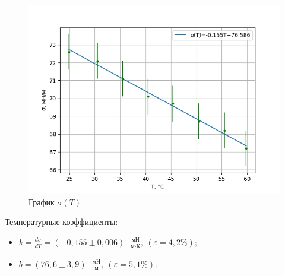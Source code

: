 \documentclass[a4paper,12pt]{article}
\theoremstyle{definition}
\begin{document}
    \begin{figure}[h!]
            \centering
            \includegraphics{st.png}
            \caption{График $\sigma(T)$}
            \label{graph}
    \end{figure}
	Температурные коэффициенты:
    \begin{itemize}
	\item $ \displaystyle \underline{k = \frac{d\sigma}{dT} = (-0,155 \pm 0,006) \text{ } \frac{\text{мН}}{\text{м}\cdot\text{К}}, \: (\varepsilon = 4,2\%);} $
	\item $ \displaystyle \underline{b = (76,6 \pm 3,9) \text{ } \frac{\text{мН}}{\text{м}}, \: (\varepsilon = 5,1\%).}$
    \end{itemize}
\end{document}
